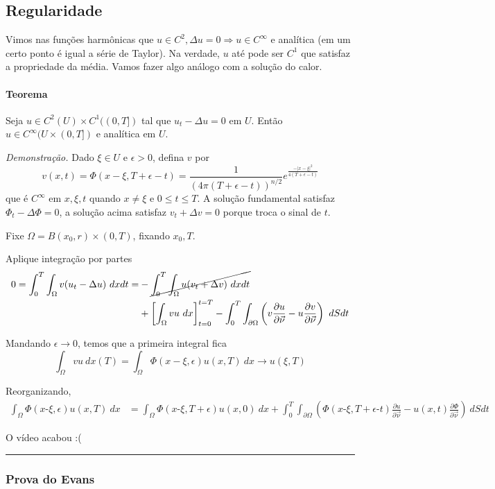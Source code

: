 \documentclass[11pt]{article}
\newcommand{\p}{\partial}
\newcommand{\e}{\epsilon}
\newcommand{\pde}[2]{\frac{\p #1}{\p #2}}
\newcommand{\dirdev}[1]{\pde{#1}{\vec{\nu}}}
\newcommand{\mi}{\text{-}}
\begin{document}
\subsection{Regularidade}
Vimos nas funções harmônicas que \(u\in C^2, \Delta u =0 \Rightarrow u \in C^\infty \) e analítica (em um certo ponto é igual a série de Taylor). Na verdade, \(u\) até pode ser \(C^1\) que satisfaz a propriedade da média. Vamos fazer algo análogo com a solução do calor.

\paragraph{Teorema} Seja \(u \in C^2 (U) \times C^1((0,T])\) tal que \(u_t - \Delta u =0 \) em \(U\). Então \(u \in C^\infty(U \times (0,T])\) e analítica em \(U\).

\textit{Demonstração.} Dado \(\xi \in U\) e \(\e>0\), defina \(v\) por \[v(x,t) = \Phi(x - \xi, T+\e-t) = \frac{1}{\left(4\pi(T+\e-t)\right)^{n/2}}e^{\frac{-|x-\xi|^2}{4(T+\e-t)}}\]que é \(C^\infty\) em \(x, \xi, t\) quando \(x\neq\xi\) e \(0\leq t \leq T\).
A solução fundamental satisfaz \(\Phi_t - \Delta\Phi =0 \), a solução acima satisfaz \(v_t + \Delta v =0 \) porque troca o sinal de \(t\).

Fixe \(\Omega = B(x_0, r)\times(0,T)\), fixando \(x_0, T\).

 Aplique integração por partes \begin{align*}
	0 = \int_0^T\int_\Omega v (u_t - \Delta u)\ dxdt = &- \cancel{\int_0^T\int_\Omega u(v_t + \Delta v)\ dxdt} \\ &+ \left[\int_\Omega vu\ dx\right]^{t=T}_{t=0} - \int_0^T \int_{\p\Omega} \left(v \dirdev{u} - u\dirdev{v}\right)\ dSdt
\end{align*}

Mandando \(\e \rightarrow 0\), temos que a primeira integral fica \[
	\int_\Omega  vu\ dx (T) = \int_\Omega\Phi(x-\xi, \e) u(x,T)\ dx \rightarrow u(\xi, T)\]
	
Reorganizando, \begin{align*}
	 \int_\Omega\Phi(x\mi \xi, \e) u(x,T)\ dx &=  \int_\Omega\Phi(x\mi \xi, T+\e) u(x,0)\ dx  +  \int_0^T \int_{\p\Omega} \left(\Phi(x\mi \xi, T+\e\mi t) \dirdev{u} - u(x,t)\dirdev{\Phi}\right)\ dSdt
\end{align*}

O vídeo acabou :(

\hrule

\subsubsection*{Prova do Evans}
\end{document}
